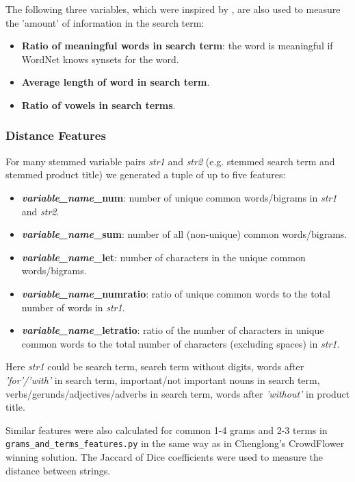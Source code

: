 \documentclass[12pt]{article}
\begin{document}
{{The following three variables, which were inspired by \cite{dato:beatthebenchmark}, are also used to measure the 'amount' of information in the search term:
\begin{itemize}
\item \textbf{Ratio of meaningful words in search term}: the word is meaningful if WordNet knows synsets for the word.
\item \textbf{Average length of word in search term}.
\item \textbf{Ratio of vowels in search terms}.
\end{itemize}

\subsubsection{Distance Features}
\label{subsubsec:Distance_Features_IandK}
For many stemmed variable pairs \emph{str1} and \emph{str2} (e.g. stemmed search term and stemmed product title) we generated a tuple of up to five features:
\begin{itemize}
\item \textbf{\emph{variable\_name}\_num}: number of unique common words/bigrams in \emph{str1} and \emph{str2}.
\item \textbf{\emph{variable\_name}\_sum}: number of all (non-unique) common words/bigrams.
\item \textbf{\emph{variable\_name}\_let}: number of characters in the unique common words/bigrams.
\item \textbf{\emph{variable\_name}\_numratio}: ratio of unique common words to the total number of words in \emph{str1}.
\item \textbf{\emph{variable\_name}\_letratio}: ratio of the number of characters in unique common words to the total number of characters (excluding spaces) in \emph{str1}.
\end{itemize}
Here \emph{str1} could be search term, search term without digits, words after \emph{'for'/'with'} in search term, important/not important nouns in search term, verbs/gerunds/adjectives/adverbs in search term, words after \emph{'without'} in product title.

Similar features were also calculated for common 1-4 grams and 2-3 terms in \texttt{grams\_and\_terms\_features.py} in the same way as in Chenglong's CrowdFlower winning solution. The Jaccard of Dice coefficients were used to measure the distance between strings.

}}
\end{document}
